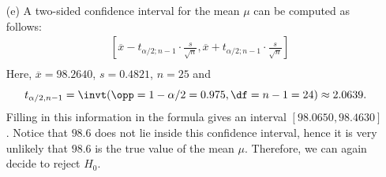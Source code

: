 {\begin{enumerate}
        Alternatively, we could have computed the $p$-value corresponding to $t_0$:
        \begin{align*}
            p &= 2 \cdot P(T \leq -3.4849)  &= 2 \cdot \tcdf(\lb=-\GRinfinity, \ub=-3.4849, \df=24) \\
                                            &\approx 0.0019.
        \end{align*}
        As $p < \alpha$, we again decide to reject $H_0$.
        There is enough evidence to assume that the mean female body temperature significantly differs from $98.6^\circ F$.
        \item[(e)] A two-sided confidence interval for the mean $\mu$ can be computed as follows:
        \begin{align*}
            &[\overline{x} - t_{\alpha/2;n-1} \cdot \frac{s}{\sqrt{n}}, \overline{x} + t_{\alpha/2;n-1} \cdot \frac{s}{\sqrt{n}}] \\
        \end{align*}
        Here, $\overline{x} = 98.2640$, $s = 0.4821$, $n=25$ and
        \[
            t_{\alpha/2,n-1} = \invt(\opp=1-\alpha/2=0.975, \df=n-1=24) \approx 2.0639.
        \]
        Filling in this information in the formula gives an interval $[98.0650, 98.4630]$.
        Notice that $98.6$ does not lie inside this confidence interval, hence it is very unlikely that $98.6$ is the true value of the mean $\mu$.
        Therefore, we can again decide to reject $H_0$.
    \end{enumerate}
}


